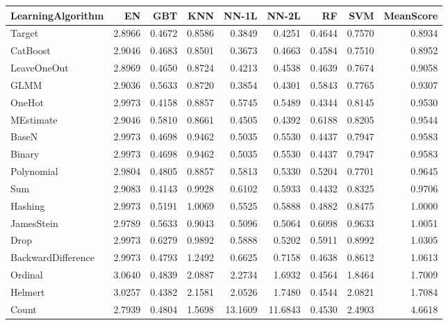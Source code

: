 \begin{tabular}{lrrrrrrrr}
\toprule
LearningAlgorithm &      EN &     GBT &     KNN &    NN-1L &    NN-2L &      RF &     SVM &  MeanScore \\
\midrule
Target             &  2.8966 &  0.4672 &  0.8586 &   0.3849 &   0.4251 &  0.4644 &  0.7570 &     0.8934 \\
CatBoost           &  2.9046 &  0.4683 &  0.8501 &   0.3673 &   0.4663 &  0.4584 &  0.7510 &     0.8952 \\
LeaveOneOut        &  2.8969 &  0.4650 &  0.8724 &   0.4213 &   0.4538 &  0.4639 &  0.7674 &     0.9058 \\
GLMM               &  2.9036 &  0.5633 &  0.8720 &   0.3854 &   0.4301 &  0.5843 &  0.7765 &     0.9307 \\
OneHot             &  2.9973 &  0.4158 &  0.8857 &   0.5745 &   0.5489 &  0.4344 &  0.8145 &     0.9530 \\
MEstimate          &  2.9046 &  0.5810 &  0.8661 &   0.4505 &   0.4392 &  0.6188 &  0.8205 &     0.9544 \\
BaseN              &  2.9973 &  0.4698 &  0.9462 &   0.5035 &   0.5530 &  0.4437 &  0.7947 &     0.9583 \\
Binary             &  2.9973 &  0.4698 &  0.9462 &   0.5035 &   0.5530 &  0.4437 &  0.7947 &     0.9583 \\
Polynomial         &  2.9804 &  0.4805 &  0.8857 &   0.5813 &   0.5330 &  0.5204 &  0.7701 &     0.9645 \\
Sum                &  2.9083 &  0.4143 &  0.9928 &   0.6102 &   0.5933 &  0.4432 &  0.8325 &     0.9706 \\
Hashing            &  2.9973 &  0.5191 &  1.0069 &   0.5525 &   0.5888 &  0.4882 &  0.8475 &     1.0000 \\
JamesStein         &  2.9789 &  0.5633 &  0.9043 &   0.5096 &   0.5064 &  0.6098 &  0.9633 &     1.0051 \\
Drop               &  2.9973 &  0.6279 &  0.9892 &   0.5888 &   0.5202 &  0.5911 &  0.8992 &     1.0305 \\
BackwardDifference &  2.9973 &  0.4793 &  1.2492 &   0.6625 &   0.7158 &  0.4638 &  0.8612 &     1.0613 \\
Ordinal            &  3.0640 &  0.4839 &  2.0887 &   2.2734 &   1.6932 &  0.4564 &  1.8464 &     1.7009 \\
Helmert            &  3.0257 &  0.4382 &  2.1581 &   2.0526 &   1.7480 &  0.4544 &  2.0821 &     1.7084 \\
Count              &  2.7939 &  0.4804 &  1.5698 &  13.1609 &  11.6843 &  0.4530 &  2.4903 &     4.6618 \\
\bottomrule
\end{tabular}
